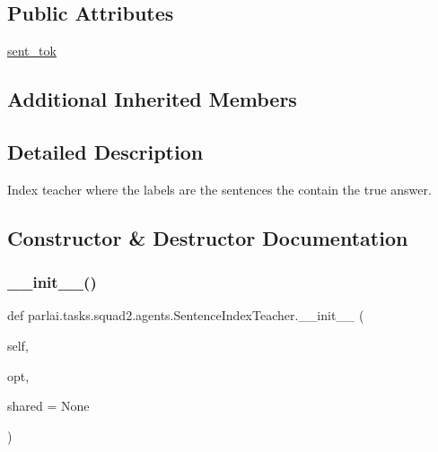 \subsection*{Public Attributes}
\begin{DoxyCompactItemize}
\item 
\hyperlink{classparlai_1_1tasks_1_1squad2_1_1agents_1_1SentenceIndexTeacher_ac9b01a4a40b5a1a6de68d24e075a22fb}{sent\+\_\+tok}
\end{DoxyCompactItemize}
\subsection*{Additional Inherited Members}


\subsection{Detailed Description}
\begin{DoxyVerb}Index teacher where the labels are the sentences the contain the true answer.
\end{DoxyVerb}
 

\subsection{Constructor \& Destructor Documentation}
\mbox{\label{classparlai_1_1tasks_1_1squad2_1_1agents_1_1SentenceIndexTeacher_ab4c46deb33f625365691be6b36f15a03}} 
\subsubsection{\texorpdfstring{\+\_\+\+\_\+init\+\_\+\+\_\+()}{\_\_init\_\_()}}
{\footnotesize\ttfamily def parlai.\+tasks.\+squad2.\+agents.\+Sentence\+Index\+Teacher.\+\_\+\+\_\+init\+\_\+\+\_\+ (\begin{DoxyParamCaption}\item[{}]{self,  }\item[{}]{opt,  }\item[{}]{shared = {\ttfamily None} }\end{DoxyParamCaption})}



